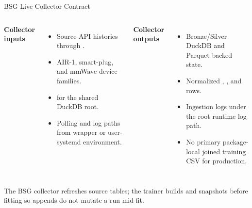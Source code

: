 \documentclass[aspectratio=169]{beamer}
\begin{document}
\begin{frame}[shrink=4]{BSG Live Collector Contract}
\begin{columns}[T,onlytextwidth]
\textbf{Collector inputs}
\begin{itemize}
  \item Source API histories through .
  \item AIR-1, smart-plug, and mmWave device families.
  \item {} for the shared DuckDB root.
  \item Polling and log paths from wrapper or user-systemd environment.
\end{itemize}

\textbf{Collector outputs}
\begin{itemize}
  \item Bronze/Silver DuckDB and Parquet-backed state.
  \item Normalized , , and  rows.
  \item Ingestion logs under the root runtime log path.
  \item No primary package-local joined training CSV for production.
\end{itemize}
\end{columns}
\tightsep
\begin{center}
\parbox{0.84\textwidth}{\centering\small The BSG collector refreshes source tables; the trainer builds and snapshots  before fitting so appends do not mutate a run mid-fit.}
\end{center}
\end{frame}
\end{document}
